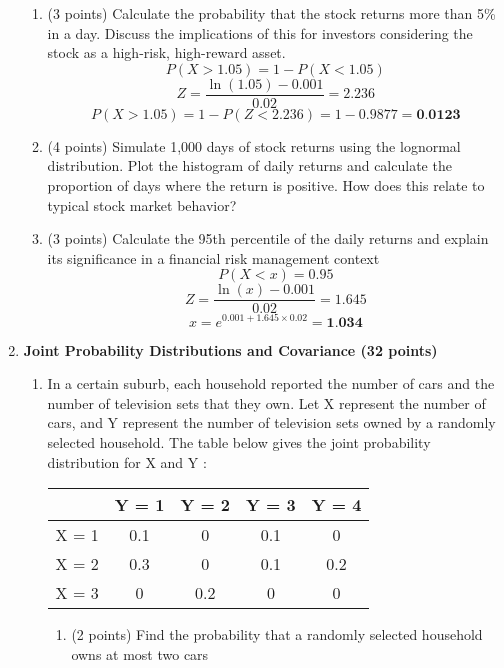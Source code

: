 \documentclass[a3paper,12pt]{article} %
\begin{document}
\begin{enumerate}
\begin{enumerate}
        \item (3 points) Calculate the probability that the stock returns more than 5\% in a day. Discuss the
        implications of this for investors considering the stock as a high-risk, high-reward asset.
        \[
            P(X > 1.05) = 1 - P(X < 1.05)
        \]
        \[
            Z = \frac{\ln(1.05) - 0.001}{0.02} = 2.236
        \]
        \[
            P(X > 1.05) = 1 - P(Z < 2.236) = 1 - 0.9877 = \textbf{0.0123}
        \]
        \item (4 points) Simulate 1,000 days of stock returns using the lognormal distribution. Plot the histogram
        of daily returns and calculate the proportion of days where the return is positive. How
        does this relate to typical stock market behavior?
        \item (3 points) Calculate the 95th percentile of the daily returns and explain its significance in a
        financial risk management context
        \[
            P(X < x) = 0.95
        \]
        \[
            Z = \frac{\ln(x) - 0.001}{0.02} = 1.645
        \]
        \[
            x = e^{0.001 + 1.645 \times 0.02} = \textbf{1.034}
        \]
    \end{enumerate}
    \newpage
    \item \textbf{Joint Probability Distributions and Covariance (32 points)}
    \begin{enumerate}
        \item In a certain suburb, each household reported the number of cars and the number of television sets
        that they own. Let X represent the number of cars, and Y represent the number of television sets
        owned by a randomly selected household. The table below gives the joint probability distribution
        for X and Y :
    \begin{center}
        \begin{tabular}{|c|c|c|c|c|}
            \hline
            & Y = 1 & Y = 2 & Y = 3 & Y = 4 \\
            \hline
            X = 1 & 0.1 & 0 & 0.1 & 0 \\
            \hline
            X = 2 & 0.3 & 0 & 0.1 & 0.2  \\
            \hline
            X = 3 & 0 & 0.2 & 0 & 0 \\
            \hline
        \end{tabular}
    \end{center}
    \begin{enumerate}
        \item (2 points) Find the probability that a randomly selected household owns at most two cars

\end{enumerate}
\end{enumerate}
\end{enumerate}
\end{document}
